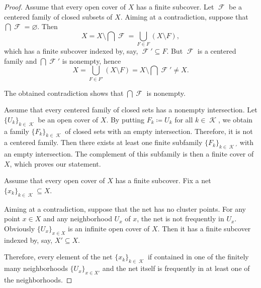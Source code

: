 \begin{proof}
   Assume that every open cover of \( X \) has a finite subcover. Let \( \mscrF \) be a centered family of closed subsets of \( X \). Aiming at a contradiction, suppose that \( \bigcap \mscrF = \varnothing \). Then
  \begin{equation*}
    X
    =
    X \setminus \bigcap \mscrF
    =
    \bigcup_{F \in F} (X \setminus F),
  \end{equation*}
  which has a finite subcover indexed by, say, \( \mscrF' \subseteq F \). But \( \mscrF \) is a centered family and \( \bigcap \mscrF' \) is nonempty, hence
  \begin{equation*}
    X
    =
    \bigcup_{F \in F'} (X \setminus F)
    =
    X \setminus \bigcap \mscrF'
    \neq
    X.
  \end{equation*}

  The obtained contradiction shows that \( \bigcap \mscrF \) is nonempty.

   Assume that every centered family of closed sets has a nonempty intersection. Let \( \{ U_k \}_{k \in \mscrK} \) be an open cover of \( X \). By putting \( F_k \coloneqq U_k \) for all \( k \in \mscrK \), we obtain a family \( \{ F_k \}_{k \in \mscrK} \) of closed sets with an empty intersection. Therefore, it is not a centered family. Then there exists at least one finite subfamily \( \{ F_k \}_{k \in \mscrK'} \) with an empty intersection. The complement of this subfamily is then a finite cover of \( X \), which proves our statement.

   Assume that every open cover of \( X \) has a finite subcover. Fix a net \( \{ x_k \}_{k \in \mscrK} \subseteq X \).

  Aiming at a contradiction, suppose that the net has no cluster points. For any point \( x \in X \) and any neighborhood \( U_x \) of \( x \), the net is not frequently in \( U_x \). Obviously \( \{ U_x \}_{x \in X} \) is an infinite open cover of \( X \). Then it has a finite subcover indexed by, say, \( X' \subseteq X \).

  Therefore, every element of the net \( \{ x_k \}_{k \in \mscrK} \) if contained in one of the finitely many neighborhoods \( \{ U_x \}_{x \in X'} \) and the net itself is frequently in at least one of the neighborhoods.


\end{proof}
